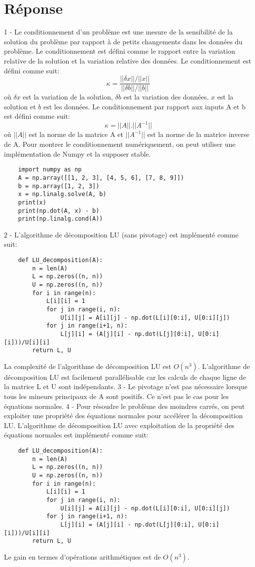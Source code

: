 \documentclass[12pt]{article}
\begin{document}
\section{Réponse}
1 - Le conditionnement d'un problème est une mesure de la sensibilité de la solution du problème par rapport à de petits 
changements dans les données du problème. Le conditionnement est défini comme le rapport entre la variation relative de la solution et
 la variation relative des données. Le conditionnement est défini comme suit: 
\begin{equation}
    \kappa = \frac{||\delta x||/||x||}{||\delta b||/||b||}
\end{equation}
où $\delta x$ est la variation de la solution, $\delta b$ est la variation des données, $x$ est la solution et $b$ est les données.
Le conditionnement par rapport aux inputs A et b est défini comme suit:
\begin{equation}
    \kappa = ||A||.||A^{-1}||
\end{equation}
où $||A||$ est la norme de la matrice A et $||A^{-1}||$ est la norme de la matrice inverse de A.
Pour montrer le conditionnement numériquement, on peut utiliser une implémentation de Numpy et la supposer stable.
\begin{lstlisting}
    import numpy as np
    A = np.array([[1, 2, 3], [4, 5, 6], [7, 8, 9]])
    b = np.array([1, 2, 3])
    x = np.linalg.solve(A, b)
    print(x)
    print(np.dot(A, x) - b)
    print(np.linalg.cond(A))
\end{lstlisting}
2 - L'algorithme de décomposition LU (sans pivotage) est implémenté comme suit:
\begin{lstlisting}
    def LU_decomposition(A):
        n = len(A)
        L = np.zeros((n, n))
        U = np.zeros((n, n))
        for i in range(n):
            L[i][i] = 1
            for j in range(i, n):
                U[i][j] = A[i][j] - np.dot(L[i][0:i], U[0:i][j])
            for j in range(i+1, n):
                L[j][i] = (A[j][i] - np.dot(L[j][0:i], U[0:i][i]))/U[i][i]
        return L, U
\end{lstlisting}
La complexité de l'algorithme de décomposition LU est $O(n^3)$.
L'algorithme de décomposition LU est facilement parallélisable car les calculs de chaque ligne de la matrice L et U sont indépendants.
3 - Le pivotage n'est pas nécessaire lorsque tous les mineurs principaux de A sont positifs. Ce n'est pas le cas pour les équations normales.
4 - Pour résoudre le problème des moindres carrés, on peut exploiter une propriété des équations normales pour accélérer la décomposition LU.
L'algorithme de décomposition LU avec exploitation de la propriété des équations normales est implémenté comme suit:
\begin{lstlisting}
    def LU_decomposition(A):
        n = len(A)
        L = np.zeros((n, n))
        U = np.zeros((n, n))
        for i in range(n):
            L[i][i] = 1
            for j in range(i, n):
                U[i][j] = A[i][j] - np.dot(L[i][0:i], U[0:i][j])
            for j in range(i+1, n):
                L[j][i] = (A[j][i] - np.dot(L[j][0:i], U[0:i][i]))/U[i][i]
        return L, U
\end{lstlisting}
Le gain en termes d'opérations arithmétiques est de $O(n^3)$.
\end{document}
